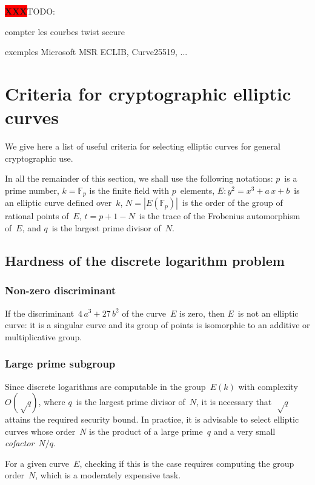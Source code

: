 \documentclass{article}
\def\F{\mathbb{F}}
\def\abs#1{\left|#1\right|}
\def\XXX{{\colorbox{red}{{\color{white}\bfseries XXX}}}}
\begin{document}
\sloppy

\XXX TODO:

compter les courbes
twist secure

exemples Microsoft MSR ECLIB, Curve25519, ...

\section{Criteria for cryptographic elliptic curves}
\label{s:criteria}

We give here a list of useful criteria for selecting elliptic curves
for general cryptographic use.

In all the remainder of this section,
we shall use the following notations:
$p$~is a prime number,
$k = \F_{p}$ is the finite field with $p$~elements,
$E: y^2 = x^3 + a\,x + b$~is an elliptic curve defined over~$k$,
$N = \abs{E(\F_p)}$~is the order of the group of rational points of~$E$,
$t = p + 1 - N$~is the trace of the Frobenius automorphism of~$E$,
and $q$~is the largest prime divisor of~$N$.

\subsection{Hardness of the discrete logarithm problem}
\subsubsection{Non-zero discriminant}

If the discriminant~$4\, a^3 + 27\,b^2$
of the curve~$E$ is zero, then $E$~is not an elliptic curve:
it is a singular curve and its group of points is isomorphic to
an additive or multiplicative group.

\subsubsection{Large prime subgroup}

Since discrete logarithms are computable in the group~$E(k)$
with complexity~$O(√q)$, where $q$~is the largest prime divisor of~$N$,
it is necessary that~$√q$ attains the required security bound.
In practice, it is advisable to select elliptic curves whose order~$N$
is the product of a large prime~$q$
and a very small \emph{cofactor}~$N/q$.

For a given curve~$E$, checking if this is the case
requires computing the group order~$N$,
which is a moderately expensive task.
\end{document}
